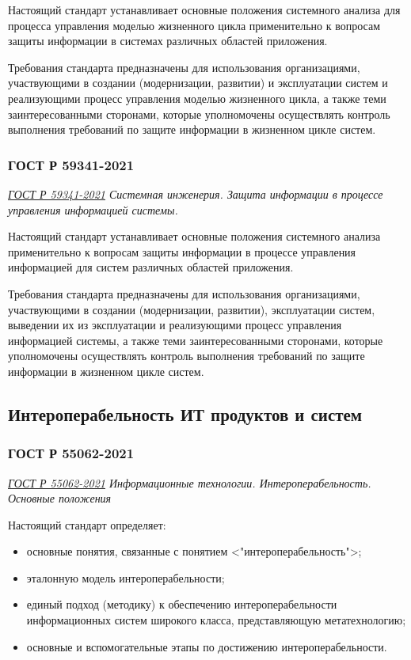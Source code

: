 Настоящий стандарт устанавливает основные положения системного анализа
для процесса управления моделью жизненного цикла применительно
к вопросам защиты информации в системах различных областей приложения.

Требования стандарта предназначены для использования организациями,
участвующими в создании (модернизации, развитии) и эксплуатации систем
и реализующими процесс управления моделью жизненного цикла,
а также теми заинтересованными сторонами,
которые уполномочены осуществлять контроль выполнения требований
по защите информации в жизненном цикле систем.

\subsubsection{ГОСТ Р 59341-2021}

\emph{\href{https://docs.cntd.ru/document/1200179545}{ГОСТ Р 59341-2021}
Системная инженерия.
Защита информации в процессе управления информацией системы.
}

Настоящий стандарт устанавливает основные положения
системного анализа применительно к вопросам защиты информации
в процессе управления информацией для систем различных областей приложения.

Требования стандарта предназначены для использования организациями,
участвующими в создании (модернизации, развитии),
эксплуатации систем, выведении их из эксплуатации
и реализующими процесс управления информацией системы,
а также теми заинтересованными сторонами,
которые уполномочены осуществлять контроль выполнения требований
по защите информации в жизненном цикле систем.

\subsection{Интероперабельность ИТ продуктов и систем}

\subsubsection{ГОСТ Р 55062-2021}

\emph{\href{https://docs.cntd.ru/document/1200181340}{ГОСТ Р 55062-2021}
Информационные технологии. Интероперабельность. Основные положения
}

Настоящий стандарт определяет:

\begin{itemize}
	\item основные понятия, связанные с понятием <"интероперабельность">;
	\item эталонную модель интероперабельности;
	\item единый подход (методику) к обеспечению интероперабельности
		информационных систем широкого класса, представляющую метатехнологию;
	\item основные и вспомогательные этапы по достижению интероперабельности.
\end{itemize}

